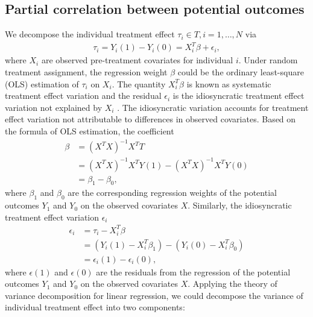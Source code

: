 	\subsection{Partial correlation between potential outcomes}
	We decompose the individual treatment effect $\tau_{i} \in T, i = 1, \dots, N$ via
	\begin{equation}
		\begin{array}{lr}
			\tau_{i} = Y_{i}(1) - Y_{i}(0) = X_{i}^{T}\beta + \epsilon_{i},
		\end{array}
	\end{equation}
	where $X_{i}$ are observed pre-treatment covariates for individual $i$. Under random treatment assignment, the regression weight $\beta$ could be the ordinary least-square (OLS) estimation of $\tau_{i}$ on $X_{i}$. The quantity $X_{i}^{T}\beta$ is known as systematic treatment effect variation and the residual $\epsilon_{i}$ is the idiosyncratic treatment effect variation not explained by $X_{i}$ \citep{ding2019decomposing, heckman1997making, djebbari2008heterogeneous}. The idiosyncratic variation accounts for treatment effect variation not attributable to differences in observed covariates. Based on the formula of OLS estimation, the coefficient 
	\begin{equation}
		\begin{array}{cl}
			\beta &= (X^{T}X)^{-1}X^{T}T \\
			&= (X^{T}X)^{-1}X^{T}Y(1) - (X^{T}X)^{-1}X^{T}Y(0) \\
			&= \beta_{1} -\beta_{0},
		\end{array}
	\end{equation}
	where $\beta_{1}$ and $\beta_{0}$ are the corresponding regression weights of the potential outcomes $Y_{1}$ and $Y_{0}$ on the observed covariates $X$. Similarly, the idiosyncratic treatment effect variation $\epsilon_{i}$
	\begin{equation}
		\begin{array}{cl}
			\epsilon_{i} &= \tau_{i} - X_{i}^{T}\beta\\
			&= (Y_{i}(1)  - X_{i}^{T}\beta_{1}) - (Y_{i}(0) - X_{i}^{T}\beta_{0})\\
			&= \epsilon_{i}(1) -\epsilon_{i}(0),
		\end{array}
	\end{equation} 
	where $\epsilon(1)$ and $\epsilon(0)$ are the residuals from the regression of the potential outcomes $Y_{1}$ and $Y_{0}$ on the observed covariates $X$. Applying the theory of variance decomposition for linear regression, we could decompose the variance of individual treatment effect into two components:
